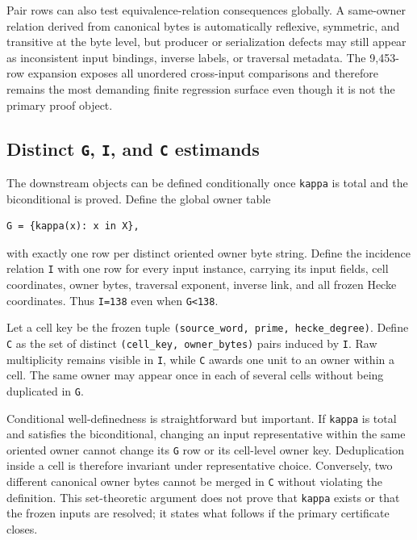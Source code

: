 \documentclass[11pt]{article}
\begin{document}
Pair rows can also test equivalence-relation consequences globally. A
same-owner relation derived from canonical bytes is automatically
reflexive, symmetric, and transitive at the byte level, but producer or
serialization defects may still appear as inconsistent input bindings,
inverse labels, or traversal metadata. The 9,453-row expansion exposes
all unordered cross-input comparisons and therefore remains the most
demanding finite regression surface even though it is not the primary
proof object.

\hypertarget{44-distinct-g-i-and-c-estimands}{%
\subsection{\texorpdfstring{Distinct \texttt{G}, \texttt{I}, and
\texttt{C}
estimands}{Distinct G, I, and C estimands}}\label{44-distinct-g-i-and-c-estimands}}

The downstream objects can be defined conditionally once \texttt{kappa}
is total and the biconditional is proved. Define the global owner table

\begin{verbatim}
G = {kappa(x): x in X},
\end{verbatim}

with exactly one row per distinct oriented owner byte string. Define the
incidence relation \texttt{I} with one row for every input instance,
carrying its input fields, cell coordinates, owner bytes, traversal
exponent, inverse link, and all frozen Hecke coordinates. Thus
\texttt{\textbar{}I\textbar{}=138} even when
\texttt{\textbar{}G\textbar{}\textless{}138}.

Let a cell key be the frozen tuple
\texttt{(source\_word,\ prime,\ hecke\_degree)}. Define \texttt{C} as
the set of distinct \texttt{(cell\_key,\ owner\_bytes)} pairs induced by
\texttt{I}. Raw multiplicity remains visible in \texttt{I}, while
\texttt{C} awards one unit to an owner within a cell. The same owner may
appear once in each of several cells without being duplicated in
\texttt{G}.

Conditional well-definedness is straightforward but important. If
\texttt{kappa} is total and satisfies the biconditional, changing an
input representative within the same oriented owner cannot change its
\texttt{G} row or its cell-level owner key. Deduplication inside a cell
is therefore invariant under representative choice. Conversely, two
different canonical owner bytes cannot be merged in \texttt{C} without
violating the definition. This set-theoretic argument does not prove
that \texttt{kappa} exists or that the frozen inputs are resolved; it
states what follows if the primary certificate closes.
\end{document}
